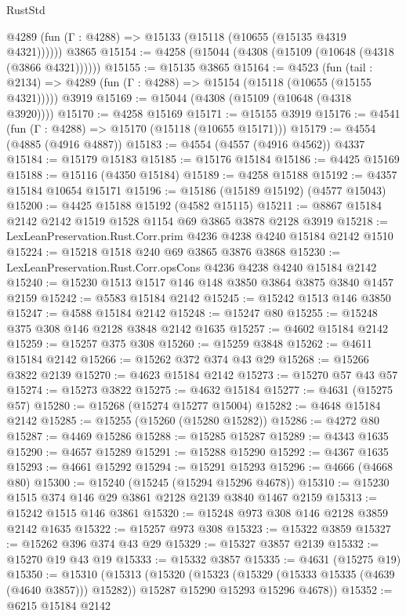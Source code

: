 \begin{lexlean}{RustStd}
\begin{coremodule}
      @4289 (fun (Γ : @4288) => @15133 (@15118 (@10655 (@15135 @4319 @4321))))))
    @3865
@15154 := @4258 (@15044 (@4308 (@15109 (@10648 (@4318 (@3866 @4321))))))
@15155 := @15135 @3865
@15164 := @4523
    (fun (tail : @2134) => @4289 (fun (Γ : @4288) => @15154 (@15118 (@10655 (@15155 @4321)))))
    @3919
@15169 := @15044 (@4308 (@15109 (@10648 (@4318 @3920))))
@15170 := @4258 @15169
@15171 := @15155 @3919
@15176 := @4541 (fun (Γ : @4288) => @15170 (@15118 (@10655 @15171)))
@15179 := @4554 (@4885 (@4916 @4887))
@15183 := @4554 (@4557 (@4916 @4562)) @4337
@15184 := @15179 @15183
@15185 := @15176 @15184
@15186 := @4425 @15169
@15188 := @15116 (@4350 @15184)
@15189 := @4258 @15188
@15192 := @4357 @15184 @10654 @15171
@15196 := @15186 (@15189 @15192) (@4577 @15043)
@15200 := @4425 @15188 @15192 (@4582 @15115)
@15211 := @8867 @15184 @2142 @2142 @1519 @1528 @1154 @69 @3865 @3878 @2128 @3919
@15218 := LexLeanPreservation.Rust.Corr.prim @4236 @4238 @4240 @15184 @2142 @1510
@15224 := @15218 @1518 @240 @69 @3865 @3876 @3868
@15230 := LexLeanPreservation.Rust.Corr.opsCons @4236 @4238 @4240 @15184 @2142
@15240 := @15230 @1513 @1517 @146 @148 @3850 @3864 @3875 @3840 @1457 @2159
@15242 := @5583 @15184 @2142
@15245 := @15242 @1513 @146 @3850
@15247 := @4588 @15184 @2142
@15248 := @15247 @80
@15255 := @15248 @375 @308 @146 @2128 @3848 @2142 @1635
@15257 := @4602 @15184 @2142
@15259 := @15257 @375 @308
@15260 := @15259 @3848
@15262 := @4611 @15184 @2142
@15266 := @15262 @372 @374 @43 @29
@15268 := @15266 @3822 @2139
@15270 := @4623 @15184 @2142
@15273 := @15270 @57 @43 @57
@15274 := @15273 @3822
@15275 := @4632 @15184
@15277 := @4631 (@15275 @57)
@15280 := @15268 (@15274 @15277 @15004)
@15282 := @4648 @15184 @2142
@15285 := @15255 (@15260 (@15280 @15282))
@15286 := @4272 @80
@15287 := @4469 @15286
@15288 := @15285 @15287
@15289 := @4343 @1635
@15290 := @4657 @15289
@15291 := @15288 @15290
@15292 := @4367 @1635
@15293 := @4661 @15292
@15294 := @15291 @15293
@15296 := @4666 (@4668 @80)
@15300 := @15240 (@15245 (@15294 @15296 @4678))
@15310 := @15230 @1515 @374 @146 @29 @3861 @2128 @2139 @3840 @1467 @2159
@15313 := @15242 @1515 @146 @3861
@15320 := @15248 @973 @308 @146 @2128 @3859 @2142 @1635
@15322 := @15257 @973 @308
@15323 := @15322 @3859
@15327 := @15262 @396 @374 @43 @29
@15329 := @15327 @3857 @2139
@15332 := @15270 @19 @43 @19
@15333 := @15332 @3857
@15335 := @4631 (@15275 @19)
@15350 := @15310
    (@15313
      (@15320
        (@15323 (@15329 (@15333 @15335 (@4639 (@4640 @3857))) @15282))
        @15287
        @15290
        @15293
        @15296
        @4678))
@15352 := @6215 @15184 @2142

\end{coremodule}
\end{lexlean}

